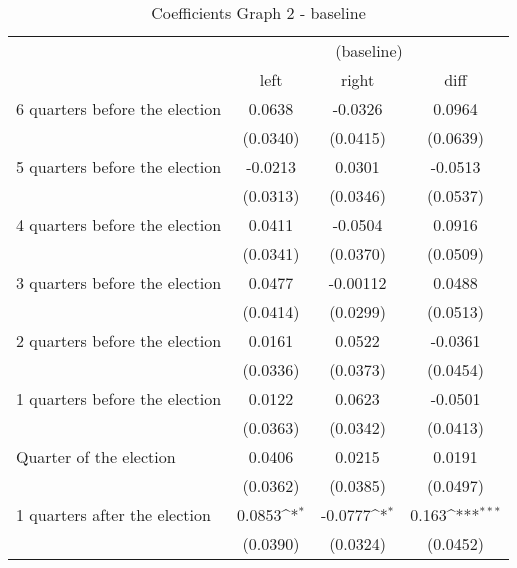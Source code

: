 \begin{table}[!ht]\centering \footnotesize
\def\sym#1{\ifmmode^{#1}\else\(^{#1}\)\fi}
\caption{Coefficients Graph 2 - baseline}
\begin{tabular}{l*{3}{c}}
\hline\hline
                    &\multicolumn{3}{c}{(baseline)}\\
                    &\multicolumn{1}{c}{left}&\multicolumn{1}{c}{right}&\multicolumn{1}{c}{diff}\\
\hline
 6 quarters before the election&      0.0638         &     -0.0326         &      0.0964         \\
                    &    (0.0340)         &    (0.0415)         &    (0.0639)         \\
[0.5em]
 5 quarters before the election&     -0.0213         &      0.0301         &     -0.0513         \\
                    &    (0.0313)         &    (0.0346)         &    (0.0537)         \\
[0.5em]
 4 quarters before the election&      0.0411         &     -0.0504         &      0.0916         \\
                    &    (0.0341)         &    (0.0370)         &    (0.0509)         \\
[0.5em]
 3 quarters before the election&      0.0477         &    -0.00112         &      0.0488         \\
                    &    (0.0414)         &    (0.0299)         &    (0.0513)         \\
[0.5em]
 2 quarters before the election&      0.0161         &      0.0522         &     -0.0361         \\
                    &    (0.0336)         &    (0.0373)         &    (0.0454)         \\
[0.5em]
 1 quarters before the election&      0.0122         &      0.0623         &     -0.0501         \\
                    &    (0.0363)         &    (0.0342)         &    (0.0413)         \\
[0.5em]
Quarter of the election&      0.0406         &      0.0215         &      0.0191         \\
                    &    (0.0362)         &    (0.0385)         &    (0.0497)         \\
[0.5em]
 1 quarters after the election&      0.0853\sym{*}  &     -0.0777\sym{*}  &       0.163\sym{***}\\
                    &    (0.0390)         &    (0.0324)         &    (0.0452)         \\

\end{tabular}
\end{table}
